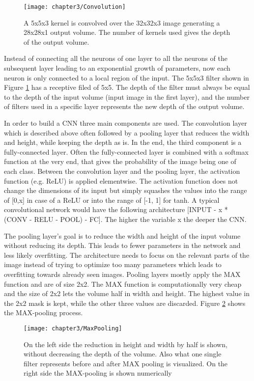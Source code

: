 \begin{figure}[H]
  \centering
  \caption{A 5x5x3 kernel is convolved over the 32x32x3 image generating a 28x28x1 output volume. The number of kernels used gives the depth of the output volume. \cite{cs231nconvolution}}
  \texttt{[image: chapter3/Convolution]}
  \label{fig:Convolution}
\end{figure}

Instead of connecting all the neurons of one layer to all the neurons of the subsequent layer leading to an exponential growth of parameters, now each neuron is only connected to a local region of the input. The 5x5x3 filter shown in Figure \ref{fig:Convolution} has a receptive filed of 5x5. The depth of the filter must always be equal to the depth of the input volume (input image in the first layer), and the number of filters used in a specific layer represents the new depth of the output volume.

In order to build a CNN three main components are used. The convolution layer which is described above often followed by a pooling layer that reduces the width and height, while keeping the depth as is. In the end, the third component is a fully-connected layer. Often the fully-connected layer is combined with a softmax function at the very end, that gives the probability of the image being one of each class. Between the convolution layer and the pooling layer, the activation function (e.g. ReLU) is applied elementwise. The activation function does not change the dimensions of its input but simply squashes the values into the range of [0,x] in case of a ReLU or into the range of [-1, 1] for tanh. A typical convolutional network would have the following architecture [INPUT - x * (CONV - RELU - POOL) - FC]. The higher the variable x the deeper the CNN.

The pooling layer's goal is to reduce the width and height of the input volume without reducing its depth. This leads to fewer parameters in the network and less likely overfitting. The architecture needs to focus on the relevant parts of the image instead of trying to optimize too many parameters which leads to overfitting towards already seen images. Pooling layers mostly apply the MAX function and are of size 2x2. The MAX function is computationally very cheap and the size of 2x2 lets the volume half in width and height. The highest value in the 2x2 mask is kept, while the other three values are discarded. Figure \ref{fig:MaxPooling} shows the MAX-pooling process.

\begin{figure}[H]
  \centering
  \caption{On the left side the reduction in height and width by half is shown, without decreasing the depth of the volume. Also what one single filter represents before and after MAX pooling is visualized. On the right side the MAX-pooling is shown numerically \cite{cs231convnetworks}}
  \texttt{[image: chapter3/MaxPooling]}
  \label{fig:MaxPooling}
\end{figure}


